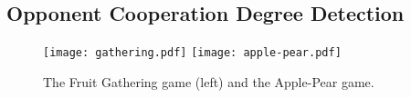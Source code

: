 \documentclass{article}
\begin{document}
\subsection{Opponent Cooperation Degree Detection}
\begin{figure}[t]
\texttt{[image: gathering.pdf]}
\texttt{[image: apple-pear.pdf]}
\caption{The Fruit Gathering game (left) and the Apple-Pear game. }
\label{game}
\end{figure}
\begin{comment}
Traditional repeated PD game settings usually assume that the opponent's action can be directly observed, and thus we can directly estimate the opponent's cooperation degree since the action is atomic (either cooperation or defection) \cite{leibo2017multi}. Even for cases where the opponent's action cannot be directly observed, we can still detect the opponent's cooperation degree from rewards using techniques such as a partial filter \cite{damer2008achieving}. Later Hernandez-Leal et al. \cite{hernandez2016bayesian,Hernandez2016Identifying} use a Bayesian approach to detect the opponent's strategy and adjust agents' strategies, which can only be used in single-state repeated PD games. However, in SPD, we are facing a more challenging cooperation degree detection problem, in which the cooperation behaviors are temporally extended. We need a way of understanding the underlying cooperation (or defection) intention of the opponents from the observed sequence of moves.
\end{comment}

\begin{comment}
Traditional repeated PD game settings assume that we can directly observe the opponent's action and then estimate its cooperation degree since the action is atomic \cite{leibo2017multi}.  Later Damer and Gini \shortcite{damer2008achieving} use a partial filter to solve the cases where the opponent's action cannot be directly observed. Hernandez-Leal et al. \shortcite{hernandez2016bayesian,Hernandez2016Identifying} use a Bayesian approach to detect the opponent's strategy in single-state repeated PD games. However, in SPD, we are facing a more challenging cooperation degree detection problem, in which the cooperation behaviors are temporally extended. We need a way of understanding the underlying cooperation (or defection) intention of the opponents from the observed sequence of moves.
\end{comment}
\end{document}

